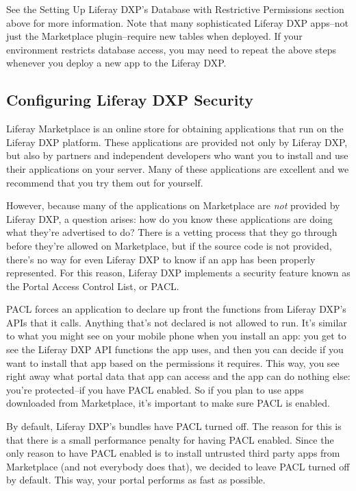 See the Setting Up Liferay DXP's Database with Restrictive Permissions
section above for more information. Note that many sophisticated Liferay
DXP apps--not just the Marketplace plugin--require new tables when
deployed. If your environment restricts database access, you may need to
repeat the above steps whenever you deploy a new app to the Liferay DXP.

\subsection{Configuring Liferay DXP
Security}\label{configuring-liferay-dxp-security}

Liferay Marketplace is an online store for obtaining applications that
run on the Liferay DXP platform. These applications are provided not
only by Liferay DXP, but also by partners and independent developers who
want you to install and use their applications on your server. Many of
these applications are excellent and we recommend that you try them out
for yourself.

However, because many of the applications on Marketplace are \emph{not}
provided by Liferay DXP, a question arises: how do you know these
applications are doing what they're advertised to do? There is a vetting
process that they go through before they're allowed on Marketplace, but
if the source code is not provided, there's no way for even Liferay DXP
to know if an app has been properly represented. For this reason,
Liferay DXP implements a security feature known as the Portal Access
Control List, or PACL.

PACL forces an application to declare up front the functions from
Liferay DXP's APIs that it calls. Anything that's not declared is not
allowed to run. It's similar to what you might see on your mobile phone
when you install an app: you get to see the Liferay DXP API functions
the app uses, and then you can decide if you want to install that app
based on the permissions it requires. This way, you see right away what
portal data that app can access and the app can do nothing else: you're
protected--if you have PACL enabled. So if you plan to use apps
downloaded from Marketplace, it's important to make sure PACL is
enabled.

By default, Liferay DXP's bundles have PACL turned off. The reason for
this is that there is a small performance penalty for having PACL
enabled. Since the only reason to have PACL enabled is to install
untrusted third party apps from Marketplace (and not everybody does
that), we decided to leave PACL turned off by default. This way, your
portal performs as fast as possible.

